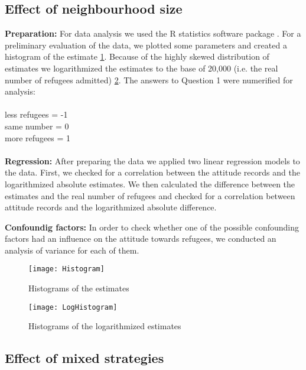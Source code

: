 \subsection{Effect of neighbourhood size}

\textbf{Preparation:} For data analysis we used the R statistics software package \citep{RCoreTeam2014}. For a preliminary evaluation of the data, we plotted some parameters and created a histogram of the estimate \ref{fig: Histogram1}. Because of the highly skewed distribution of estimates we logarithmized the estimates to the base of 20,000 (i.e. the real number of refugees admitted) \ref{fig: Histogram2}.
The answers to Question 1 were numerified for analysis: \\
\\
\indent\indent less refugees = -1\\
\indent\indent same number = 0\\
\indent\indent more refugees = 1\\
\\
\textbf{Regression:} After preparing the data we applied two linear regression models to the data. First, we checked for a correlation between the attitude records and the logarithmized absolute estimates. We then calculated the difference between the estimates and the real number of refugees and checked for a correlation between attitude records and the logarithmized absolute difference.


\noindent\textbf{Confoundig factors:} In order to check whether one of the possible confounding factors had an influence on the attitude towards refugees, we conducted an analysis of variance for each of them.



\begin{figure}[H]
	\centering 
	\texttt{[image: Histogram]}
	\caption{Histograms of the estimates}\label{fig: Histogram1}
\end{figure}

\begin{figure}[H]
	\centering 
	\texttt{[image: LogHistogram]}
	\caption{Histograms of the logarithmized estimates}\label{fig: Histogram2}
\end{figure}




\subsection{Effect of mixed strategies}



